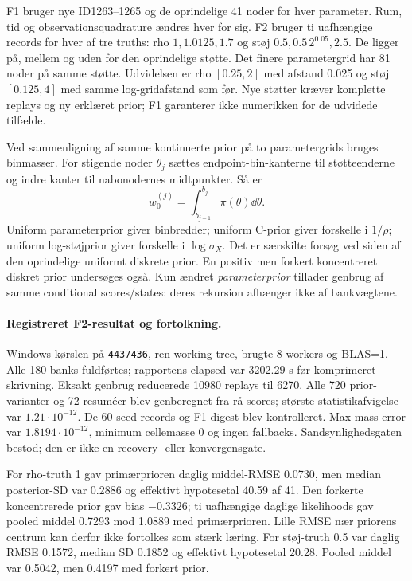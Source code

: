 F1 bruger nye ID1263--1265 og de oprindelige 41 noder for hver parameter.
Rum, tid og observationsquadrature ændres hver for sig. F2 bruger ti
uafhængige records for hver af tre truths: rho \(1,1.0125,1.7\) og
støj \(0.5,0.5\,2^{0.05},2.5\). De ligger på, mellem og uden for
den oprindelige støtte. Det finere parametergrid har 81 noder på samme
støtte. Udvidelsen er rho \([0.25,2]\) med afstand 0.025 og støj
\([0.125,4]\) med samme log-gridafstand som før. Nye støtter kræver
komplette replays og ny erklæret prior; F1 garanterer ikke numerikken
for de udvidede tilfælde.

Ved sammenligning af samme kontinuerte prior på to parametergrids bruges
binmasser. For stigende noder \(\theta_j\) sættes endpoint-bin-kanterne
til støtteenderne og indre kanter til nabonodernes midtpunkter. Så er
\begin{equation}
 w_0^{(j)}=\int_{b_{j-1}}^{b_j}\pi(\theta)\dd\theta.
\end{equation}
Uniform parameterprior giver binbredder; uniform C-prior giver forskelle
i \(1/\rho\); uniform log-støjprior giver forskelle i \(\log\sigma_X\).
Det er særskilte forsøg ved siden af den oprindelige uniformt diskrete
prior. En positiv men forkert koncentreret diskret prior undersøges også.
Kun ændret \emph{parameterprior} tillader genbrug af samme conditional
scores/states: deres rekursion afhænger ikke af bankvægtene.

\paragraph{Registreret F2-resultat og fortolkning.}
Windows-kørslen på \texttt{4437436}, ren working tree, brugte 8 workers og
BLAS=1. Alle 180 banks fuldførtes; rapportens elapsed var 3202.29 s før
komprimeret skrivning. Eksakt genbrug reducerede 10980 replays til 6270.
Alle 720 prior-varianter og 72 resuméer blev genberegnet fra rå scores;
største statistikafvigelse var \(1.21\cdot10^{-12}\). De 60 seed-records
og F1-digest blev kontrolleret. Max mass error var
\(1.8194\cdot10^{-12}\), minimum cellemasse 0 og ingen fallbacks.
Sandsynlighedsgaten bestod; den er ikke en recovery- eller konvergensgate.

For rho-truth 1 gav primærprioren daglig middel-RMSE 0.0730, men median
posterior-SD var 0.2886 og effektivt hypotesetal 40.59 af 41.
Den forkerte koncentrerede prior gav bias \(-0.3326\); ti uafhængige
daglige likelihoods gav pooled middel 0.7293 mod 1.0889 med primærprioren.
Lille RMSE nær priorens centrum kan derfor ikke fortolkes som stærk læring.
For støj-truth 0.5 var daglig RMSE 0.1572, median SD 0.1852 og effektivt
hypotesetal 20.28. Pooled middel var 0.5042, men 0.4197 med forkert prior.

